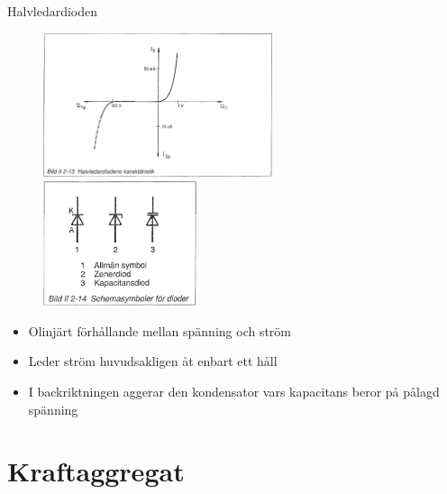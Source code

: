 \documentclass{beamer}
\begin{document}
\begin{frame}{Halvledardioden}

\begin{figure}[h]
\includegraphics[width=0.6\textwidth]{images/bild_2_2-13}
\includegraphics[width=0.4\textwidth]{images/bild_2_2-14}
\label{fig:BildII1-16}
\end{figure}

\begin{itemize}
  \item Olinjärt förhållande mellan spänning och ström
  \item Leder ström huvudsakligen åt enbart ett håll
  \item I backriktningen aggerar den kondensator vars kapacitans beror på pålagd spänning
  \end{itemize}
\end{frame}

\section{Kraftaggregat}
\end{document}
